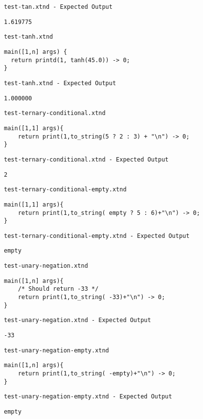 \medskip \noindent \texttt{test-tan.xtnd - Expected Output}


\begin{lstlisting}
1.619775
\end{lstlisting}


\medskip \noindent \texttt{test-tanh.xtnd}


\begin{lstlisting}
main([1,n] args) {
  return printd(1, tanh(45.0)) -> 0;
}
\end{lstlisting}


\medskip \noindent \texttt{test-tanh.xtnd - Expected Output}


\begin{lstlisting}
1.000000
\end{lstlisting}


\medskip \noindent \texttt{test-ternary-conditional.xtnd}


\begin{lstlisting}
main([1,1] args){
	return print(1,to_string(5 ? 2 : 3) + "\n") -> 0;
}
\end{lstlisting}


\medskip \noindent \texttt{test-ternary-conditional.xtnd - Expected Output}


\begin{lstlisting}
2
\end{lstlisting}


\medskip \noindent \texttt{test-ternary-conditional-empty.xtnd}


\begin{lstlisting}
main([1,1] args){
	return print(1,to_string( empty ? 5 : 6)+"\n") -> 0;
}
\end{lstlisting}


\medskip \noindent \texttt{test-ternary-conditional-empty.xtnd - Expected Output}


\begin{lstlisting}
empty
\end{lstlisting}


\medskip \noindent \texttt{test-unary-negation.xtnd}


\begin{lstlisting}
main([1,n] args){
	/* Should return -33 */
	return print(1,to_string( -33)+"\n") -> 0;
}
\end{lstlisting}


\medskip \noindent \texttt{test-unary-negation.xtnd - Expected Output}


\begin{lstlisting}
-33
\end{lstlisting}


\medskip \noindent \texttt{test-unary-negation-empty.xtnd}


\begin{lstlisting}
main([1,n] args){
	return print(1,to_string( -empty)+"\n") -> 0;
}
\end{lstlisting}


\medskip \noindent \texttt{test-unary-negation-empty.xtnd - Expected Output}


\begin{lstlisting}
empty
\end{lstlisting}




